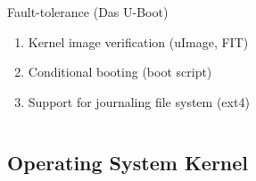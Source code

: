 \documentclass{beamer}
\begin{document}
\begin{frame}
\begin{columns}[C]
{\begin{column}{5cm}
\begin{alertblock}{Fault-tolerance (Das U-Boot)}
\begin{enumerate}
          \item Kernel image verification (uImage, FIT)
          \item Conditional booting (boot script)
          \item Support for journaling file system (ext4)
          \end{enumerate}
        \end{alertblock}
      \end{column}
    }
  \end{columns}
\end{frame}

\subsection{Operating System Kernel}
\end{document}
